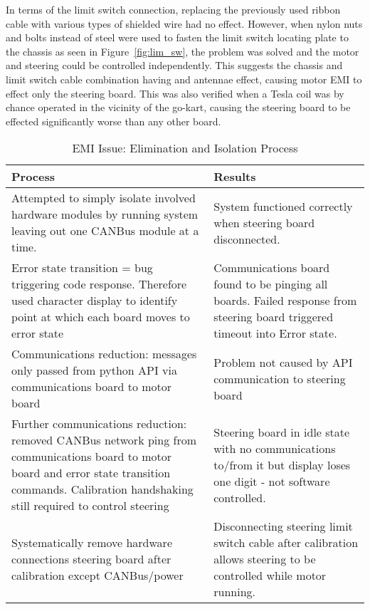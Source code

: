 \documentclass{ENZCon}
\begin{document}
In terms of the limit switch connection, replacing the previously used ribbon cable with various types of shielded wire had no effect. However, when nylon nuts and bolts instead of steel were used to fasten the limit switch locating plate to the chassis as seen in Figure~\ref{fig:lim_sw}, the problem was solved and the motor and steering could be controlled independently. This suggests the chassis and limit switch cable combination having and antennae effect, causing motor EMI to effect only the steering board. This was also verified when a Tesla coil was by chance operated in the vicinity of the go-kart, causing the steering board to be effected significantly worse than any other board. 



\begin{table}[htbp]
	\centering
		\begin{tabular}{|p{}|p{}|}
		\hline
		\textbf{Process} & \textbf{Results}\\
		\hline
		Attempted to simply isolate involved hardware modules by running system leaving out one CANBus module at a time. & System functioned correctly when steering board disconnected.\\
		\hline
		Error state transition = bug triggering code response. Therefore used character display to identify point at which each board moves to error state & Communications board found to be pinging all boards. Failed response from steering board triggered timeout into Error state.\\
		\hline
		Communications reduction: messages only passed from python API via communications board to motor board & Problem not caused by API communication to steering board\\
		\hline
		Further communications reduction: removed CANBus network ping from communications board to motor board and error state transition commands. Calibration handshaking still required to control steering & Steering board in idle state with no communications to/from it but display loses one digit - not software controlled.\\
		\hline			
		Systematically remove hardware connections steering board after calibration except CANBus/power & Disconnecting steering limit switch cable after calibration allows steering to be controlled while motor running.\\
		\hline
		\end{tabular}
	\caption{EMI Issue: Elimination and Isolation Process}
	\label{tab:EMI}
\end{table}
\end{document}
